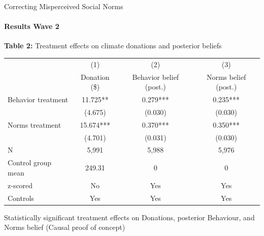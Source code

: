 \documentclass{beamer}
\begin{document}
\begin{frame}{Correcting Misperceived Social Norms}
\framesubtitle{Results Wave 2}

    \begin{table}[h]
    \centering
    \scriptsize
    \textbf{Table 2:} Treatment effects on climate donations and posterior beliefs\par
    \begin{tabular}{lccc}
    \toprule\toprule
                       & (1)          & (2)                    & (3)                  \\
                       & Donation (\$) & Behavior belief (post.) & Norms belief (post.) \\
    \midrule
    Behavior treatment & 11.725**     & 0.279***               & 0.235***             \\
                       & (4.675)      & (0.030)                & (0.030)              \\
    \addlinespace
    Norms treatment    & 15.674***    & 0.370***               & 0.350***             \\
                       & (4.701)      & (0.031)                & (0.030)              \\
    \midrule
    N                  & 5,991        & 5,988                  & 5,976                \\
    Control group mean & 249.31       & 0                      & 0                    \\
    z-scored           & No           & Yes                    & Yes                  \\
    Controls           & Yes          & Yes                    & Yes                  \\
    \bottomrule\bottomrule
    \end{tabular}

    \medskip
    
    \footnotesize
    Statistically significant treatment effects on Donations, posterior Behaviour, and Norms belief (Causal proof of concept)
    \end{table}

\end{frame}
\end{document}
